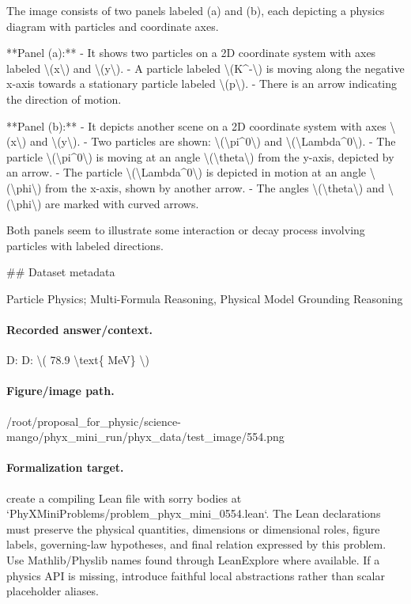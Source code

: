 The image consists of two panels labeled (a) and (b), each depicting a physics diagram with particles and coordinate axes.

**Panel (a):**
- It shows two particles on a 2D coordinate system with axes labeled \textbackslash{}(x\textbackslash{}) and \textbackslash{}(y\textbackslash{}).
- A particle labeled \textbackslash{}(K\textasciicircum{}-\textbackslash{}) is moving along the negative x-axis towards a stationary particle labeled \textbackslash{}(p\textbackslash{}).
- There is an arrow indicating the direction of motion.

**Panel (b):**
- It depicts another scene on a 2D coordinate system with axes \textbackslash{}(x\textbackslash{}) and \textbackslash{}(y\textbackslash{}).
- Two particles are shown: \textbackslash{}(\textbackslash{}pi\textasciicircum{}0\textbackslash{}) and \textbackslash{}(\textbackslash{}Lambda\textasciicircum{}0\textbackslash{}).
- The particle \textbackslash{}(\textbackslash{}pi\textasciicircum{}0\textbackslash{}) is moving at an angle \textbackslash{}(\textbackslash{}theta\textbackslash{}) from the y-axis, depicted by an arrow.
- The particle \textbackslash{}(\textbackslash{}Lambda\textasciicircum{}0\textbackslash{}) is depicted in motion at an angle \textbackslash{}(\textbackslash{}phi\textbackslash{}) from the x-axis, shown by another arrow.
- The angles \textbackslash{}(\textbackslash{}theta\textbackslash{}) and \textbackslash{}(\textbackslash{}phi\textbackslash{}) are marked with curved arrows.

Both panels seem to illustrate some interaction or decay process involving particles with labeled directions.

\#\# Dataset metadata

Particle Physics; Multi-Formula Reasoning, Physical Model Grounding Reasoning

\paragraph{Recorded answer/context.}
D: D: \textbackslash{}( 78.9 \textbackslash{}text\{ MeV\} \textbackslash{})

\paragraph{Figure/image path.}
/root/proposal\_for\_physic/science-mango/phyx\_mini\_run/phyx\_data/test\_image/554.png

\paragraph{Formalization target.}
create a compiling Lean file with sorry bodies at `PhyXMiniProblems/problem\_phyx\_mini\_0554.lean`. The Lean declarations must preserve the physical quantities, dimensions or dimensional roles, figure labels, governing-law hypotheses, and final relation expressed by this problem.
Use Mathlib/Physlib names found through LeanExplore where available. If a physics API is missing, introduce faithful local abstractions rather than scalar placeholder aliases.

